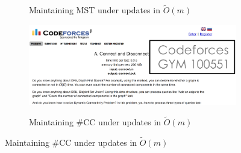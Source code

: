 \documentclass[12pt]{beamer}
\begin{document}
\begin{spacing}{1.3}
{\begin{figure}
{\begin{subfigure}[H]{0.58\textwidth}
			\label{exp1}
			\caption{Maintaining MST under updates in \scriptsize$\widetilde{O}(m)$}
		\end{subfigure}
		\begin{subfigure}[H]{0.58\textwidth}
			\vspace{14pt}
			\includegraphics[width=1\textwidth]{cf100551}
			\label{exp2}
			\caption{Maintaining \#CC under updates in \scriptsize$\widetilde{O}(m)$}
		\end{subfigure}
		}
	\end{figure}
}


\end{spacing}
\end{document}
